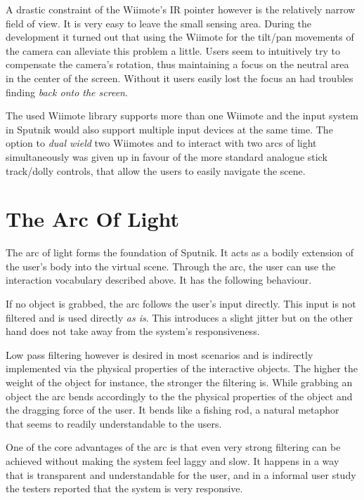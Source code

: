 \documentclass[10pt,a4paper]{scrartcl}
\begin{document}
A drastic constraint of the Wiimote's IR pointer however is the relatively narrow field of view. It is very easy to leave the small sensing area. During the development it turned out that using the Wiimote for the tilt/pan movements of the camera can alleviate this problem a little. Users seem to intuitively try to compensate the camera's rotation, thus maintaining a focus on the neutral area in the center of the screen. Without it users easily lost the focus an had troubles finding \emph{back onto the screen}.

The used Wiimote library supports more than one Wiimote and the input system in Sputnik would also support multiple input devices at the same time. The option to \emph{dual wield} two Wiimotes and to interact with two arcs of light simultaneously was given up in favour of the more standard analogue stick track/dolly controls, that allow the users to easily navigate the scene. 



\section{The Arc Of Light}
The arc of light forms the foundation of Sputnik. It acts as a bodily extension of the user's body into the virtual scene. Through the arc, the user can use the interaction vocabulary described above. It has the following behaviour.

If no object is grabbed, the arc follows the user's input directly. This input is not filtered and is used directly \emph{as is}. This introduces a slight jitter but on the other hand does not take away from the system's responsiveness. 

Low pass filtering however is desired in most scenarios and is indirectly implemented via the physical properties of the interactive objects. The higher the weight of the object for instance, the stronger the filtering is. While grabbing an object the arc bends accordingly to the the physical properties of the object and the dragging force of the user. It bends like a fishing rod, a natural metaphor that seems to readily understandable to the users.

One of the core advantages of the arc is that even very strong filtering can be achieved without making the system feel laggy and slow. It happens in a way that is transparent and understandable for the user, and in a informal user study the testers reported that the system is very responsive.
\end{document}
